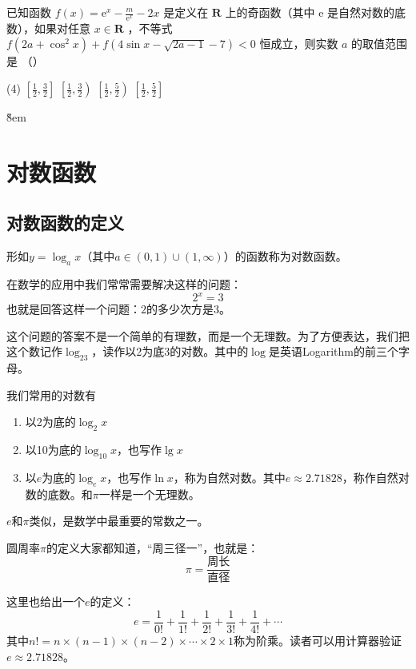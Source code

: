 \begin{example}
    已知函数 $f(x)=\mathrm{e}^x-\frac{m}{\mathrm{e}^x}-2 x$ 是定义在 $\mathbf{R}$ 上的奇函数（其中 e 是自然对数的底数），如果对任意 $x \in \mathbf{R}$ ，不等式 $f\left(2 a+\cos ^2 x\right)+f(4 \sin x-\sqrt{2 a-1}-7)<0$ 恒成立，则实数 $a$ 的取值范围是 （\qquad）
    \begin{tasks}(4)
        \task $\left[\frac{1}{2}, \frac{3}{2}\right]$
        \task $\left[\frac{1}{2}, \frac{3}{2}\right)$
        \task $\left[\frac{1}{2}, \frac{5}{2}\right)$
        \task $\left[\frac{1}{2}, \frac{5}{2}\right]$
    \end{tasks}
\end{example}

\v{8em}

\section{对数函数}

\subsection{对数函数的定义}
\begin{definition}[对数函数]
    形如$y=\log_ax$（其中$a\in (0,1)\cup (1,\infty)$）的函数称为对数函数。
\end{definition}
\begin{note}[对数]
    在数学的应用中我们常常需要解决这样的问题：
    $$
        2^x=3
    $$
    也就是回答这样一个问题：$2$的多少次方是$3$。

    这个问题的答案不是一个简单的有理数，而是一个无理数。为了方便表达，我们把这个数记作$\log_23$，读作以2为底3的对数。其中的$\log$是英语Logarithm的前三个字母。

    我们常用的对数有
    \begin{enumerate}
        \item 以2为底的$\log_2x$
        \item 以10为底的$\log_{10}x$，也写作$\lg x$
        \item 以$e$为底的$\log_ex$，也写作$\ln x$，称为自然对数。其中$e\approx 2.71828$，称作自然对数的底数。和$\pi$一样是一个无理数。
    \end{enumerate}
\end{note}
\begin{definition}[自然对数的底数]
    $e$和$\pi$类似，是数学中最重要的常数之一。

    圆周率$\pi$的定义大家都知道，“周三径一”，也就是：
    $$
        \pi = \frac{\text{周长}}{\text{直径}}
    $$

    这里也给出一个$e$的定义：
    $$
        e = \frac{1}{0!}+\frac{1}{1!}+\frac{1}{2!}+\frac{1}{3!}+\frac{1}{4!}+\cdots
    $$
    其中$n!=n\times(n-1)\times(n-2)\times\cdots\times 2\times 1$称为阶乘。读者可以用计算器验证$e\approx 2.71828$。
\end{definition}

